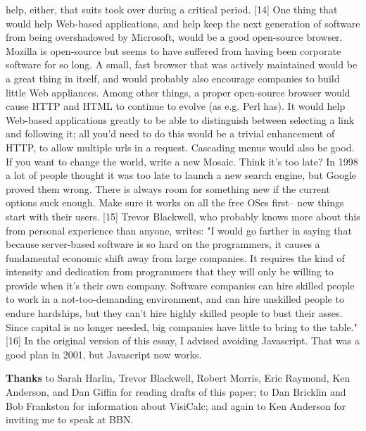 help, either, that suits took over during a critical period.
[14] One thing that would help Web-based applications, and help
keep the next generation of software from being overshadowed by
Microsoft, would be a good open-source browser.  Mozilla is
open-source but seems to have suffered from having been corporate
software for so long.  A small, fast browser that was actively
maintained would be a great thing in itself, and would probably
also encourage companies to build little Web appliances.
Among other things, a proper open-source browser would cause HTTP
and HTML to continue to evolve (as e.g. Perl has).  It would help
Web-based applications greatly to be able to distinguish between
selecting a link and following it; all you'd need to do this would
be a trivial enhancement of HTTP, to allow multiple urls in a
request.  Cascading menus would also be good.
If you want to change the world, write a new Mosaic.  Think it's
too late?  In 1998 a lot of people thought it was too late to launch
a new search engine, but Google proved them wrong.  There is always
room for something new if the current options suck enough.  Make
sure it works on all the free OSes first-- new things start with
their users.
[15] Trevor Blackwell, who probably knows more about this from
personal experience than anyone, writes:
"I would go farther in saying that because server-based software
is so hard on the programmers, it causes a fundamental economic
shift away from large companies. It requires the kind of intensity
and dedication from programmers that they will only be willing to
provide when it's their own company.  Software companies can hire
skilled people to work in a not-too-demanding environment, and can
hire unskilled people to endure hardships, but they can't hire
highly skilled people to bust their asses. Since capital is no
longer needed, big companies have little to bring to the table."
[16] In the original version of this essay, I advised avoiding
Javascript.  That was a good plan in 2001, but Javascript now works.

\textbf{Thanks} to Sarah Harlin, Trevor Blackwell, Robert Morris, Eric Raymond, Ken Anderson,
and Dan Giffin for reading drafts of this paper; to Dan Bricklin and
Bob Frankston for information about VisiCalc; and again to Ken Anderson
for inviting me to speak at BBN.
